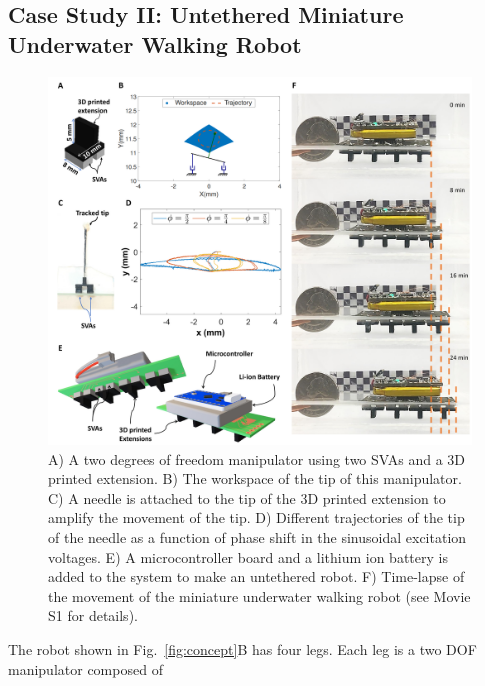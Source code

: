 \subsection{Case Study II: Untethered Miniature Underwater Walking Robot} 
\begin{figure}[!t]
      \centering
      \includegraphics[width=1\textwidth]{Fig3.pdf}
      \caption{A) A two degrees of freedom manipulator using two SVAs and a 3D printed extension. B) The workspace of the tip of this manipulator. C) A needle is attached to the tip of the 3D printed extension to amplify the movement of the tip. D) Different trajectories of the tip of the needle as a function of phase shift in the sinusoidal excitation voltages. E) A microcontroller board and a lithium ion battery is added to the system to make an untethered robot. F) Time-lapse of the movement of the miniature underwater walking robot (see Movie S1 for details).}
      \label{fig:untethered_podia}
\end{figure}
The robot shown in Fig.~\ref{fig:concept}B has four legs. Each leg is a two DOF manipulator composed of 
